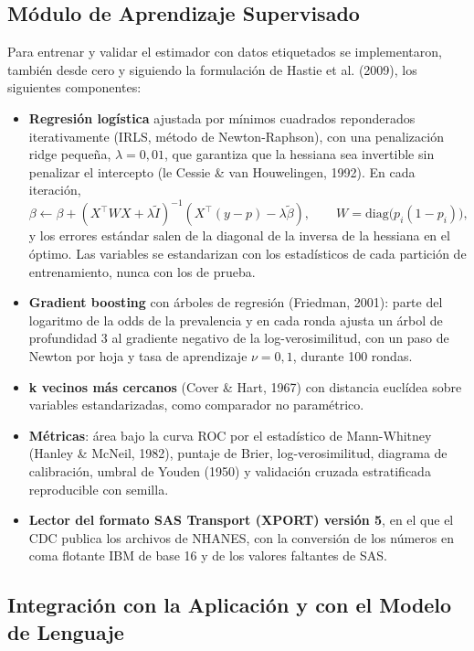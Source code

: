 \documentclass[12pt,letterpaper]{article}
\begin{document}
\subsection{Módulo de Aprendizaje Supervisado}

Para entrenar y validar el estimador con datos etiquetados se implementaron,
también desde cero y siguiendo la formulación de Hastie et al. (2009), los
siguientes componentes:

\begin{itemize}
  \item \textbf{Regresión logística} ajustada por mínimos cuadrados
    reponderados iterativamente (IRLS, método de Newton-Raphson), con una
    penalización ridge pequeña, $\lambda=0{,}01$, que garantiza que la hessiana
    sea invertible sin penalizar el intercepto (le Cessie \& van Houwelingen,
    1992). En cada iteración,
    \[
    \beta \leftarrow \beta + \left(X^{\top}WX+\lambda\tilde I\right)^{-1}
    \left(X^{\top}(y-p)-\lambda\tilde\beta\right),\qquad
    W=\mathrm{diag}\big(p_i(1-p_i)\big),
    \]
    y los errores estándar salen de la diagonal de la inversa de la hessiana en
    el óptimo. Las variables se estandarizan con los estadísticos de cada
    partición de entrenamiento, nunca con los de prueba.
  \item \textbf{Gradient boosting} con árboles de regresión (Friedman, 2001):
    parte del logaritmo de la odds de la prevalencia y en cada ronda ajusta un
    árbol de profundidad 3 al gradiente negativo de la log-verosimilitud, con un
    paso de Newton por hoja y tasa de aprendizaje $\nu=0{,}1$, durante 100 rondas.
  \item \textbf{k vecinos más cercanos} (Cover \& Hart, 1967) con distancia
    euclídea sobre variables estandarizadas, como comparador no paramétrico.
  \item \textbf{Métricas}: área bajo la curva ROC por el estadístico de
    Mann-Whitney (Hanley \& McNeil, 1982), puntaje de Brier, log-verosimilitud,
    diagrama de calibración, umbral de Youden (1950) y validación cruzada
    estratificada reproducible con semilla.
  \item \textbf{Lector del formato SAS Transport (XPORT) versión 5}, en el que el
    CDC publica los archivos de NHANES, con la conversión de los números en coma
    flotante IBM de base 16 y de los valores faltantes de SAS.
\end{itemize}

\subsection{Integración con la Aplicación y con el Modelo de Lenguaje}
\end{document}
